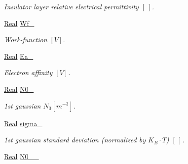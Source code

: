 \begin{DoxyCompactItemize}
\begin{DoxyCompactList}\small\item\em Insulator layer relative electrical permittivity $ \left[ ~ \right] $. \end{DoxyCompactList}\item 
\hypertarget{classParamList_a9121165703c9ef6b60fe469701a48fad}{\hyperlink{typedefs_8h_a060b837c3b4486ee35317744156f3da2}{Real} \hyperlink{classParamList_a9121165703c9ef6b60fe469701a48fad}{Wf\-\_\-}}\label{classParamList_a9121165703c9ef6b60fe469701a48fad}

\begin{DoxyCompactList}\small\item\em Work-\/function $ \left[ V \right] $. \end{DoxyCompactList}\item 
\hypertarget{classParamList_aed555e87b2a431b6ecabaf17813ed289}{\hyperlink{typedefs_8h_a060b837c3b4486ee35317744156f3da2}{Real} \hyperlink{classParamList_aed555e87b2a431b6ecabaf17813ed289}{Ea\-\_\-}}\label{classParamList_aed555e87b2a431b6ecabaf17813ed289}

\begin{DoxyCompactList}\small\item\em Electron affinity $ \left[ V \right] $. \end{DoxyCompactList}\item 
\hypertarget{classParamList_aa51672586248c54289ad6ac1a5d3c274}{\hyperlink{typedefs_8h_a060b837c3b4486ee35317744156f3da2}{Real} \hyperlink{classParamList_aa51672586248c54289ad6ac1a5d3c274}{N0\-\_\-}}\label{classParamList_aa51672586248c54289ad6ac1a5d3c274}

\begin{DoxyCompactList}\small\item\em 1st gaussian $ N_0 \left[ m^{-3} \right] $. \end{DoxyCompactList}\item 
\hypertarget{classParamList_a37293181f9beea97f75b133deb9d9119}{\hyperlink{typedefs_8h_a060b837c3b4486ee35317744156f3da2}{Real} \hyperlink{classParamList_a37293181f9beea97f75b133deb9d9119}{sigma\-\_\-}}\label{classParamList_a37293181f9beea97f75b133deb9d9119}

\begin{DoxyCompactList}\small\item\em 1st gaussian standard deviation (normalized by $ K_B \cdot T $) $ \left[ ~ \right] $. \end{DoxyCompactList}\item 
\hypertarget{classParamList_a5cd86383f9ae39d6a8851c5b470051eb}{\hyperlink{typedefs_8h_a060b837c3b4486ee35317744156f3da2}{Real} \hyperlink{classParamList_a5cd86383f9ae39d6a8851c5b470051eb}{N0\-\_\-\_\-}}\label{classParamList_a5cd86383f9ae39d6a8851c5b470051eb}


\end{DoxyCompactItemize}
